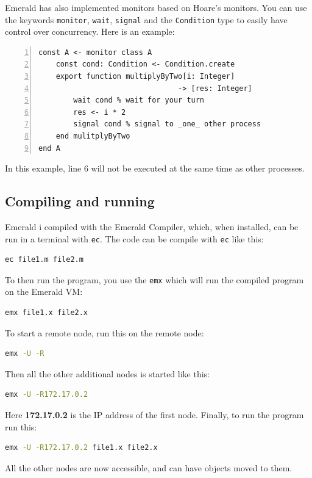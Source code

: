 Emerald has also implemented monitors based on Hoare's monitors\cite{hoare_monitors_1974}. You can use the keywords \verb|monitor|, \verb|wait|, \verb|signal| and the \verb|Condition| type to easily have control over concurrency. Here is an example:
\begin{lstlisting}[language=emerald, numbers=left]
const A <- monitor class A
    const cond: Condition <- Condition.create
    export function multiplyByTwo[i: Integer] 
                                -> [res: Integer]
        wait cond % wait for your turn
        res <- i * 2
        signal cond % signal to _one_ other process
    end mulitplyByTwo
end A
\end{lstlisting}
In this example, line 6 will not be executed at the same time as other processes.







\subsection{Compiling and running}
Emerald i compiled with the Emerald Compiler\cite{noauthor_emeraldold-emerald_2019}, which, when installed, can be run in a terminal with \verb|ec|. The code can be compile with \verb|ec| like this:
\begin{lstlisting}[language=Bash]
ec file1.m file2.m 
\end{lstlisting}
To then run the program, you use the \verb|emx| which will run the compiled program on the Emerald VM:
\begin{lstlisting}[language=Bash]
emx file1.x file2.x
\end{lstlisting}

To start a remote node, run this on the remote node:
\begin{lstlisting}[language=Bash]
emx -U -R
\end{lstlisting}
Then all the other additional nodes is started like this:
\begin{lstlisting}[language=Bash]
emx -U -R172.17.0.2
\end{lstlisting}
Here \textbf{172.17.0.2} is the IP address of the first node.
Finally, to run the program run this:
\begin{lstlisting}[language=Bash]
emx -U -R172.17.0.2 file1.x file2.x
\end{lstlisting}
All the other nodes are now accessible, and can have objects moved to them.



